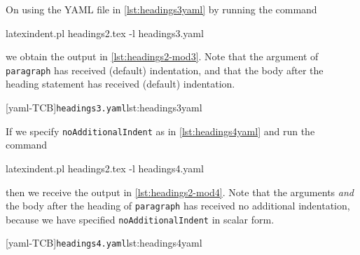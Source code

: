 \documentclass[10pt]{article}
\begin{document}

 \begin{example}
 On using the YAML file in \cref{lst:headings3yaml} by running the command

 \begin{commandshell}
latexindent.pl headings2.tex -l headings3.yaml      
\end{commandshell}

 we obtain the output in \cref{lst:headings2-mod3}. Note that the argument of
 \texttt{paragraph} has received (default) indentation, and that the body after the
 heading statement has received (default) indentation.

 \begin{cmhtcbraster}[raster column skip=.1\linewidth]
  [yaml-TCB]{\texttt{headings3.yaml}}{lst:headings3yaml}
 \end{cmhtcbraster}

 If we specify \texttt{noAdditionalIndent} as in \cref{lst:headings4yaml} and run the
 command 

 \begin{commandshell}
latexindent.pl headings2.tex -l headings4.yaml      
\end{commandshell}

 then we receive the output in \cref{lst:headings2-mod4}. Note that the arguments
 \emph{and} the body after the heading of \texttt{paragraph} has received no additional
 indentation, because we have specified \texttt{noAdditionalIndent} in scalar form.

 \begin{cmhtcbraster}[raster column skip=.1\linewidth]
  [yaml-TCB]{\texttt{headings4.yaml}}{lst:headings4yaml}
 \end{cmhtcbraster}
 \end{example}
\end{document}
